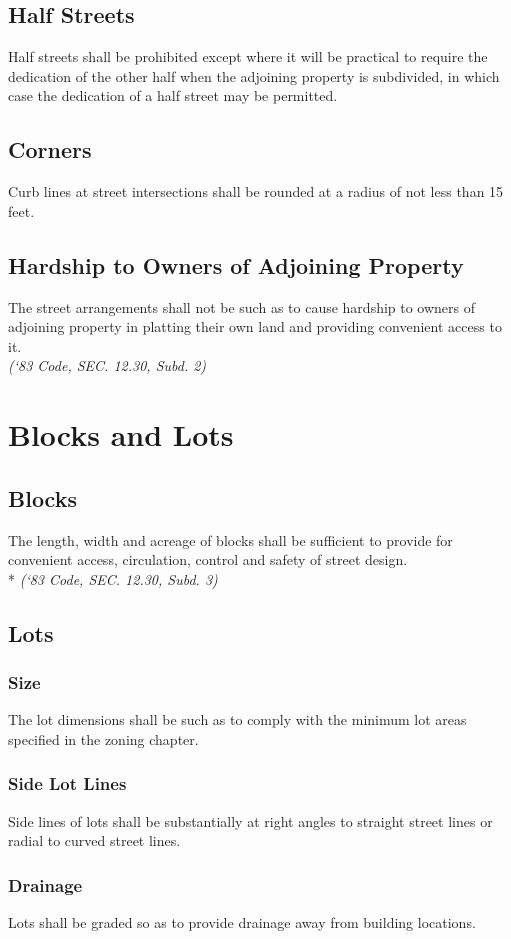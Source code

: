 \subsection{Half Streets}
Half streets shall be prohibited except where it will be practical to require the dedication of the other half when the adjoining property is subdivided, in which case the dedication of a half street may be permitted.
\subsection{Corners}
Curb lines at street intersections shall be rounded at a radius of not less than 15 feet.
\subsection{Hardship to Owners of Adjoining Property}
The street arrangements shall not be such as to cause hardship to owners of adjoining property in platting their own land and providing convenient access to it.\\
\emph{(‘83 Code, SEC. 12.30, Subd. 2)}

\section{Blocks and Lots}
\subsection{Blocks}
The length, width and acreage of blocks shall be sufficient to provide for convenient access, circulation, control and safety of street design.\\*
\emph{(‘83 Code, SEC. 12.30, Subd. 3)}
\subsection{Lots}
\subsubsection{Size}
The lot dimensions shall be such as to comply with the minimum lot areas specified in the zoning chapter.
\subsubsection{Side Lot Lines}
Side lines of lots shall be substantially at right angles to straight street lines or radial to curved street lines.
\subsubsection{Drainage}
Lots shall be graded so as to provide drainage away from building locations.
